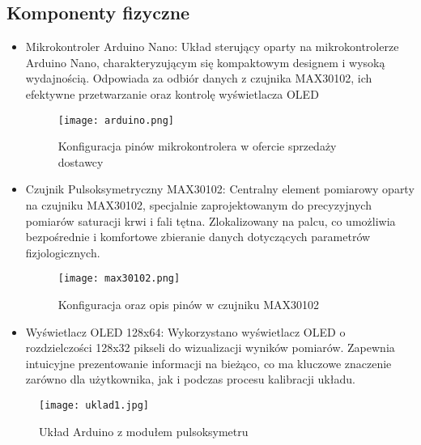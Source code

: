 \subsection{Komponenty fizyczne}
\begin{itemize}
  \item Mikrokontroler Arduino Nano: Układ sterujący oparty na mikrokontrolerze Arduino Nano, charakteryzującym się kompaktowym designem i wysoką wydajnością. Odpowiada za odbiór danych z czujnika MAX30102, ich efektywne przetwarzanie oraz kontrolę wyświetlacza OLED
  \begin{figure}[!htb]
    \centering
    \texttt{[image: arduino.png]}
    \caption{Konfiguracja pinów mikrokontrolera w ofercie sprzedaży dostawcy \cite{arduinofota}}
  \end{figure}
  \item Czujnik Pulsoksymetryczny MAX30102: Centralny element pomiarowy oparty na czujniku MAX30102, specjalnie zaprojektowanym do precyzyjnych pomiarów saturacji krwi i fali tętna. Zlokalizowany na palcu, co umożliwia bezpośrednie i komfortowe zbieranie danych dotyczących parametrów fizjologicznych.
  \begin{figure}[!htb]
    \centering
    \texttt{[image: max30102.png]}
    \caption{Konfiguracja oraz opis pinów w czujniku MAX30102 \cite{max30102}}
  \end{figure}
  \item Wyświetlacz OLED 128x64: Wykorzystano wyświetlacz OLED o rozdzielczości 128x32 pikseli do wizualizacji wyników pomiarów. Zapewnia intuicyjne prezentowanie informacji na bieżąco, co ma kluczowe znaczenie zarówno dla użytkownika, jak i podczas procesu kalibracji układu.
\end{itemize}

\begin{figure}[!htb]
  \centering
  \texttt{[image: uklad1.jpg]}
  \caption{Układ Arduino z modułem pulsoksymetru}
\end{figure}
